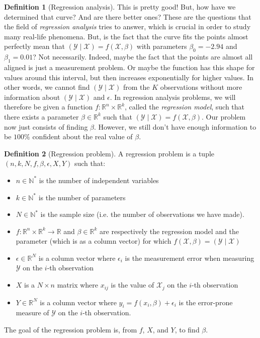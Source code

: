 \documentclass{article}
\theoremstyle{definition}
\newtheorem{definition}{Definition}[section]
\theoremstyle{remark}
\theoremstyle{example}
\begin{document}
\begin{definition}[Regression analysis]
		This is pretty good! But, how have we determined that curve? And are there better ones? These are the questions that the field of \textit{regression analysis} tries to answer, which is crucial in order to study many real-life phenomena. But, is the fact that the curve fits the points almost perfectly mean that $(\mathcal{Y} \mid \mathcal{X}) = f(\mathcal{X}, \beta)$ with parameters $\beta_0 = -2.94$ and $\beta_1 = 0.01$? Not necessarily. Indeed, maybe the fact that the points are almost all aligned is just a measurement problem. Or maybe the function has this shape for values around this interval, but then increases exponentially for higher values. In other words, we cannot find $(\mathcal{Y} \mid \mathcal{X})$ from the $K$ observations without more information about $(\mathcal{Y} \mid \mathcal{X})$ and $\epsilon$. In regression analysis problems, we will therefore be given a function $f : \mathbb{R}^n \times \mathbb{R}^k$, called the \textit{regression model}, such that there exists a parameter $\beta \in \mathbb{R}^k$ such that $(\mathcal{Y} \mid \mathcal{X}) = f(\mathcal{X}, \beta)$. Our problem now just consists of finding $\beta$. However, we still don't have enough information to be $100\%$ confident about the real value of $\beta$.
\end{definition}

\begin{definition}[Regression problem]
		A regression problem is a tuple $(n, k, N, f, \beta, \epsilon, X, Y)$ such that:
		\begin{itemize}
				\item $n \in \mathbb{N}^*$ is the number of independent variables
				\item $k \in \mathbb{N}^*$ is the number of parameters
				\item $N \in \mathbb{N}^*$ is the sample size (i.e. the number of observations we have made).
				\item $f : \mathbb{R}^n \times \mathbb{R}^k \rightarrow \mathbb{R}$ and $\beta \in \mathbb{R}^k$ are respectively the regression model and the parameter (which is as a column vector) for which $f(\mathcal{X}, \beta) = (\mathcal{Y} \mid \mathcal{X})$
				\item $\epsilon \in \mathbb{R}^N$ is a column vector where $\epsilon_i$ is the measurement error when measuring $\mathcal{Y}$ on the $i$-th observation
				\item $X$ is a $N \times n$ matrix where $x_{ij}$ is the value of $\mathcal{X}_j$ on the $i$-th observation
				\item $Y \in \mathbb{R}^N$ is a column vector where $y_i = f(x_i, \beta) + \epsilon_i$ is the error-prone measure of $\mathcal{Y}$ on the $i$-th observation.
		\end{itemize}
		The goal of the regression problem is, from $f$, $X$, and $Y$, to find $\beta$.
\end{definition}
\end{document}
